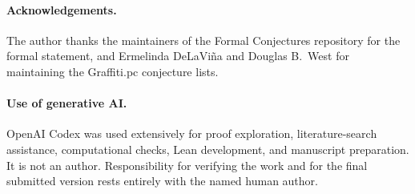 \documentclass[11pt]{article}
\numberwithin{equation}{section}
\theoremstyle{remark}
\begin{document}
\paragraph{Acknowledgements.}
The author thanks the maintainers of the Formal Conjectures repository for
the formal statement, and Ermelinda DeLaVi\~na and Douglas B.\ West for
maintaining the Graffiti.pc conjecture lists.

\paragraph{Use of generative AI.}
OpenAI Codex was used extensively for proof exploration, literature-search
assistance, computational checks, Lean development, and manuscript
preparation.  It is not an author.  Responsibility for verifying the work and
for the final submitted version rests entirely with the named human author.
\end{document}
